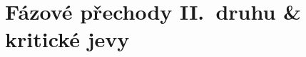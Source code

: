 \providecommand{\gmini}[3]{%
  \begin{scope}[shift={#1}]
    \draw[fill=white] (0,0) circle (#3);
    \draw ({-0.55*#3},{0.5*#3}) -- ({-0.55*#3},{-0.45*#3}) -- ({0.6*#3},{-0.45*#3});
    \node[font=\tiny\bfseries\itshape] at ({-0.7*#3},{0.2*#3}) {G};
    \node[font=\tiny\bfseries\itshape] at ({0.05*#3},{-0.65*#3}) {V};
    \draw[thick,scale=#3] plot[smooth] coordinates {#2};
  \end{scope}}

\section{Fázové přechody II.\ druhu \& kritické jevy}

